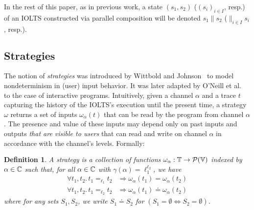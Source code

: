 \documentclass[preprint,5p,twocolumn]{elsarticle}
\newtheorem{definition}[theorem]{Definition}
\begin{document}
In the rest of this paper, as in previous work,
a state $(s_1,s_2)$ ($(s_i)_{i \in I}$, resp.) of an IOLTS constructed
via parallel composition will be denoted $s_1 \parallel s_2$ ($\parallel_{i \in I} s_i$, resp.).


\subsection{Strategies}
\label{sec:strategies}

The notion of \emph{strategies} was introduced by Wittbold and Johnson~\cite{Wittbold1990}
to model nondeterminism in (user) input behavior. It was later adapted by O'Neill et
al.~\cite{ONeill2006} to the case of interactive programs. Intuitively, given a channel $\alpha$
and a trace $t$ capturing the history of the IOLTS's execution until the present time, a strategy
$\omega$ returns a set of inputs $\omega_\alpha(t)$ that can be read by the program from channel $\alpha$. The presence and value of these inputs may depend only
on past inputs and outputs \emph{that are visible to users} that can read and write on channel
$\alpha$ in accordance with the channel's levels. Formally:


\begin{definition}
  \label{def:strategy}
  A \emph{strategy} is a collection of functions $\omega_\alpha: \mathbb{T} \rightarrow \mathcal{P}(\mathbb{V})$ indexed by $\alpha \in \mathbb{C}$ such that, for all $\alpha \in \mathbb{C}$ with $\gamma(\alpha)=\ell_1^{\ell_2}$, we have
  \begin{align*}
    \forall t_1, t_2.\, t_1 =_{\ell_1} t_2 &\Longrightarrow \omega_\alpha(t_1) = \omega_\alpha(t_2)\\
    \forall t_1, t_2.\, t_1 =_{\ell_2} t_2 &\Longrightarrow \omega_\alpha(t_1) \doteq \omega_\alpha(t_2)
  \end{align*}
  where for any sets $S_1,S_2$, we write $S_1 \doteq S_2$ for $(S_1 = \emptyset \Leftrightarrow S_2 = \emptyset)$.
\end{definition}
\end{document}
